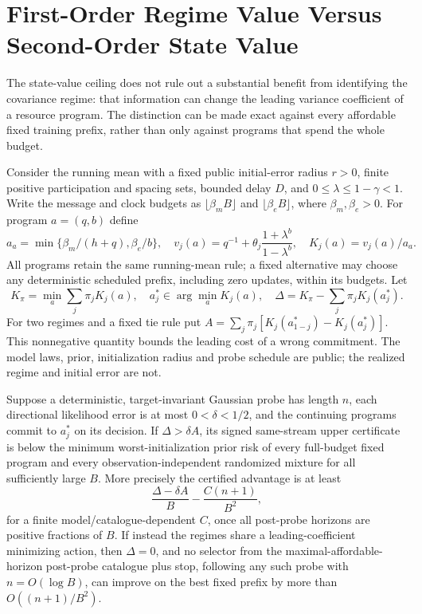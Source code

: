 \section{First-Order Regime Value Versus Second-Order State Value}
The state-value ceiling does not rule out a substantial benefit from identifying
the covariance regime: that information can change the leading variance
coefficient of a resource program.
The distinction can be made exact against every affordable fixed training
prefix, rather than only against programs that spend the whole budget.

Consider the running mean with a fixed public initial-error radius $r>0$,
finite positive participation and spacing sets, bounded delay $D$, and
$0\le\lambda\le1-\gamma<1$.
Write the message and clock budgets as $\lfloor\beta_m B\rfloor$ and
$\lfloor\beta_e B\rfloor$, where $\beta_m,\beta_e>0$.
For program $a=(q,b)$ define
\[
a_a=\min\{\beta_m/(h+q),\beta_e/b\},\quad
v_j(a)=q^{-1}+\theta_j\frac{1+\lambda^b}{1-\lambda^b},\quad
K_j(a)=v_j(a)/a_a.
\]
All programs retain the same running-mean rule; a fixed alternative may choose
any deterministic scheduled prefix, including zero updates, within its budgets.
Let
\[
K_\pi=\min_a\sum_j\pi_jK_j(a),\quad
a_j^*\in\arg\min_aK_j(a),\quad
\Delta=K_\pi-\sum_j\pi_jK_j(a_j^*).
\]
For two regimes and a fixed tie rule put
$A=\sum_j\pi_j[K_j(a_{1-j}^*)-K_j(a_j^*)]$.
This nonnegative quantity bounds the leading cost of a wrong commitment.
The model laws, prior, initialization radius and probe schedule are public;
the realized regime and initial error are not.

\begin{theorem}
Suppose a deterministic, target-invariant Gaussian probe has length $n$,
each directional likelihood error is at most $0<\delta<1/2$, and the continuing
programs commit to $a_j^*$ on its decision.
If $\Delta>\delta A$, its signed same-stream upper certificate is below the
minimum worst-initialization prior risk of every full-budget fixed program
and every observation-independent randomized mixture for all sufficiently
large $B$.
More precisely the certified advantage is at least
\[
\frac{\Delta-\delta A}{B}
-\frac{C(n+1)}{B^2},
\]
for a finite model/catalogue-dependent $C$, once all post-probe horizons are
positive fractions of $B$.
If instead the regimes share a leading-coefficient minimizing action, then
$\Delta=0$, and no selector from the maximal-affordable-horizon post-probe
catalogue plus stop, following any such probe with $n=O(\log B)$, can
improve on the best fixed prefix by more than $O((n+1)/B^2)$.
\label{thm:research-leading-separation}
\end{theorem}


